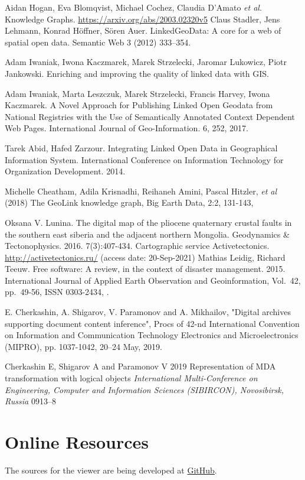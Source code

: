 \documentclass[
]{ceurart}
\begin{document}
\begin{thebibliography}{99}

 Aidan Hogan, Eva Blomqvist, Michael Cochez, Claudia D’Amato \emph{et al}. Knowledge Graphs. \url{https://arxiv.org/abs/2003.02320v5}
 Claus Stadler, Jens Lehmann, Konrad Höffner, Sören Auer. LinkedGeoData: A core for a web of spatial open data. Semantic Web 3 (2012) 333–354. 

 Adam Iwaniak, Iwona Kaczmarek, Marek Strzelecki, Jaromar Lukowicz, Piotr Jankowski. Enriching and improving the quality of linked data with GIS. 

 Adam Iwaniak, Marta Leszczuk, Marek Strzelecki, Francis Harvey, Iwona Kaczmarek. A Novel Approach for Publishing Linked Open Geodata from National Registries with the Use of Semantically Annotated Context Dependent Web Pages. International Journal of Geo-Information. 6, 252, 2017. 

 Tarek Abid, Hafed Zarzour. Integrating Linked Open Data in Geographical
Information System. International Conference on Information Technology for Organization Development. 2014.

 Michelle Cheatham, Adila Krisnadhi, Reihaneh Amini, Pascal Hitzler, \emph{et al} (2018) The GeoLink knowledge graph, Big Earth Data, 2:2, 131-143, 

 Oksana V. Lunina.  The digital map of the pliocene quaternary crustal faults in the southern east siberia and the adjacent northern Mongolia. Geodynamics \& Tectonophysics. 2016. 7(3):407-434. 
 Cartographic service Activetectonics. \url{http://activetectonics.ru/} (access date: 20-Sep-2021)
 Mathias Leidig, Richard Teeuw. Free software: A review, in the context of disaster management. 2015. International Journal of Applied Earth Observation and Geoinformation,
Vol.~42, pp.~49-56, ISSN 0303-2434, .

   E. Cherkashin, A. Shigarov, V. Paramonov and A. Mikhailov, "Digital archives supporting document content inference", Procs of 42-nd International Convention on Information and Communication Technology Electronics and Microelectronics (MIPRO), pp. 1037-1042, 20–24 May, 2019. 

  Cherkashin E, Shigarov A and Paramonov V 2019 Representation of MDA transformation with logical objects \emph{International Multi-Conference on Engineering, Computer and Information Sciences (SIBIRCON), Novosibirsk, Russia} 0913--8 


\end{thebibliography}

\appendix

\section{Online Resources}

The sources for the viewer are being developed at
\href{https://github.com/De17eon/GRL}{GitHub}.
\end{document}
